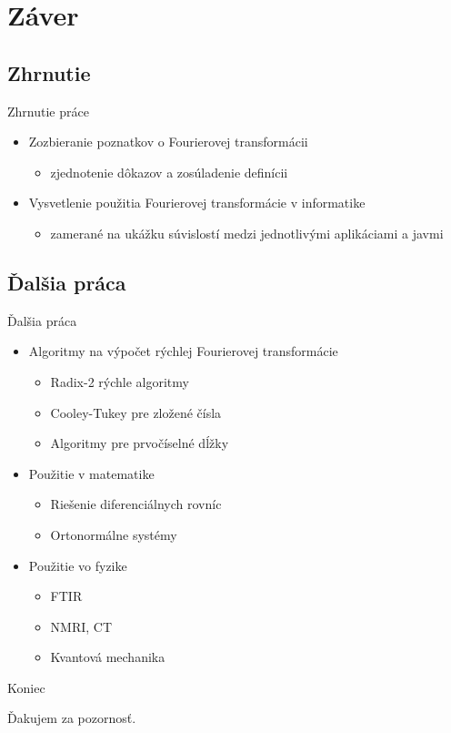 \documentclass{beamer}
\begin{document}
\section{Záver}
\subsection{Zhrnutie}
\begin{frame}{Zhrnutie práce}
    \begin{itemize}
        \item Zozbieranie poznatkov o Fourierovej transformácii
            \begin{itemize}
            \item zjednotenie dôkazov a zosúladenie definícii
            \end{itemize}
        \item Vysvetlenie použitia Fourierovej transformácie v
        informatike
            \begin{itemize}
            \item zamerané na ukážku súvislostí medzi jednotlivými
            aplikáciami a javmi
            \end{itemize}

    \end{itemize}
\end{frame}

\subsection{Ďalšia práca}
\begin{frame}{Ďalšia práca}
    \begin{itemize}
        \item Algoritmy na výpočet rýchlej Fourierovej transformácie
            \begin{itemize}
                \item Radix-2 rýchle algoritmy
                \item Cooley-Tukey pre zložené čísla
                \item Algoritmy pre prvočíselné dĺžky
            \end{itemize}
        \item Použitie v matematike
            \begin{itemize}
                \item Riešenie diferenciálnych rovníc
                \item Ortonormálne systémy
            \end{itemize}
        \item Použitie vo fyzike
            \begin{itemize}
                \item FTIR
                \item NMRI, CT
                \item Kvantová mechanika
            \end{itemize}
    \end{itemize}
\end{frame}


\begin{frame}{Koniec}
    \begin{table}
    \begin{centering}
        \large Ďakujem za pozornosť.
    \end{centering}
    \end{table}
\end{frame}
\end{document}
